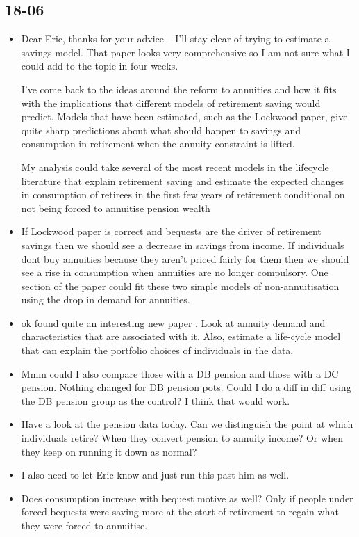 \documentclass[12pt]{article}
\begin{document}
\subsection{\textbf{18-06}}
\begin{itemize}
    \item Dear Eric, thanks for your advice -- I'll stay clear of trying to estimate a savings model. That paper looks
          very comprehensive so I am not sure what I could add to the topic in four weeks.

          I've come back to the ideas around the reform to annuities and how it fits with the implications that different models
          of retirement saving would predict. Models that have been estimated, such as the Lockwood paper, give quite sharp
          predictions about what should happen to savings and consumption in retirement when the annuity constraint is lifted.

          My analysis could take several of the most recent models in the lifecycle literature that explain retirement saving
          and estimate the expected changes in consumption of retirees in the first few years of retirement conditional on not
          being forced to annuitise pension wealth

    \item If Lockwood paper is correct and bequests are the driver of retirement savings then we should see a decrease in savings
          from income. If individuals dont buy annuities because they aren't priced fairly for them then we should see a rise in consumption
          when annuities are no longer compulsory. One section of the paper could fit these two simple models of non-annuitisation using
          the drop in demand for annuities.


    \item ok found quite an interesting new paper \cite{inkman_et_al_rfs_2011}. Look
          at annuity demand and characteristics that are associated with it. Also,
          estimate a life-cycle model that can explain the portfolio choices
          of individuals in the data.

    \item Mmm could I also compare those with a DB pension and those with a DC pension.
          Nothing changed for DB pension pots. Could I do a diff in diff using the DB pension group
          as the control? I think that would work.

    \item Have a look at the pension data today. Can we distinguish the point at which individuals retire?
          When they convert pension to annuity income? Or when they keep on running it down as normal?

    \item I also need to let Eric know and just run this past him as well.


    \item Does consumption increase with bequest motive as well? Only if people under forced bequests were
          saving more at the start of retirement to regain what they were forced to annuitise.


\end{itemize}
\end{document}
